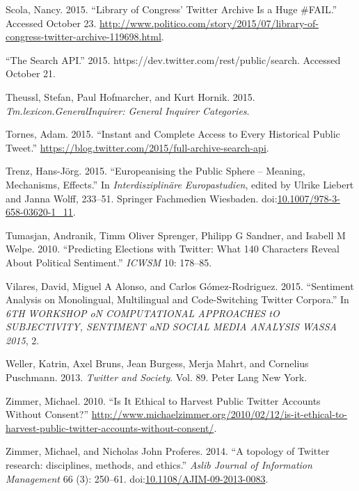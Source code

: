 \documentclass[]{article}
\begin{document}
Scola, Nancy. 2015. ``Library of Congress' Twitter Archive Is a Huge
\#FAIL.'' Accessed October 23.
\url{http://www.politico.com/story/2015/07/library-of-congress-twitter-archive-119698.html}.

``The Search API.'' 2015. https://dev.twitter.com/rest/public/search.
Accessed October 21.

Theussl, Stefan, Paul Hofmarcher, and Kurt Hornik. 2015.
\emph{Tm.lexicon.GeneralInquirer: General Inquirer Categories}.

Tornes, Adam. 2015. ``Instant and Complete Access to Every Historical
Public Tweet.''
\url{https://blog.twitter.com/2015/full-archive-search-api}.

Trenz, Hans-Jörg. 2015. ``Europeanising the Public Sphere -- Meaning,
Mechanisms, Effects.'' In \emph{Interdisziplinäre Europastudien}, edited
by Ulrike Liebert and Janna Wolff, 233--51. Springer Fachmedien
Wiesbaden.
doi:\href{http://dx.doi.org/10.1007/978-3-658-03620-1_11}{10.1007/978-3-658-03620-1\_11}.

Tumasjan, Andranik, Timm Oliver Sprenger, Philipp G Sandner, and Isabell
M Welpe. 2010. ``Predicting Elections with Twitter: What 140 Characters
Reveal About Political Sentiment.'' \emph{ICWSM} 10: 178--85.

Vilares, David, Miguel A Alonso, and Carlos G{ó}mez-Rodr{i}guez. 2015.
``Sentiment Analysis on Monolingual, Multilingual and Code-Switching
Twitter Corpora.'' In \emph{6TH WORKSHOP oN COMPUTATIONAL APPROACHES tO
SUBJECTIVITY, SENTIMENT aND SOCIAL MEDIA ANALYSIS WASSA 2015}, 2.

Weller, Katrin, Axel Bruns, Jean Burgess, Merja Mahrt, and Cornelius
Puschmann. 2013. \emph{Twitter and Society}. Vol. 89. Peter Lang New
York.

Zimmer, Michael. 2010. ``Is It Ethical to Harvest Public Twitter
Accounts Without Consent?''
\url{http://www.michaelzimmer.org/2010/02/12/is-it-ethical-to-harvest-public-twitter-accounts-without-consent/}.

Zimmer, Michael, and Nicholas John Proferes. 2014. ``A topology of
Twitter research: disciplines, methods, and ethics.'' \emph{Aslib
Journal of Information Management} 66 (3): 250--61.
doi:\href{http://dx.doi.org/10.1108/AJIM-09-2013-0083}{10.1108/AJIM-09-2013-0083}.
\end{document}
